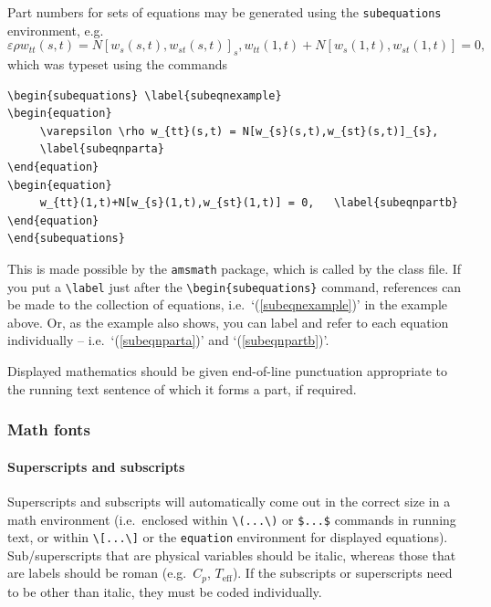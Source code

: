 \documentclass[]{interact}
\theoremstyle{plain}%
\theoremstyle{definition}
\theoremstyle{remark}
\begin{document}
Part numbers for sets of equations may be generated using the \texttt{subequations} environment, e.g.
\begin{subequations} \label{subeqnexample}
\begin{equation}
     \varepsilon \rho w_{tt}(s,t) = N[w_{s}(s,t),w_{st}(s,t)]_{s},
     \label{subeqnparta}
\end{equation}
\begin{equation}
     w_{tt}(1,t)+N[w_{s}(1,t),w_{st}(1,t)] = 0,
     \label{subeqnpartb}
\end{equation}
\end{subequations}
which was typeset using the commands
\begin{verbatim}
\begin{subequations} \label{subeqnexample}
\begin{equation}
     \varepsilon \rho w_{tt}(s,t) = N[w_{s}(s,t),w_{st}(s,t)]_{s},
     \label{subeqnparta}
\end{equation}
\begin{equation}
     w_{tt}(1,t)+N[w_{s}(1,t),w_{st}(1,t)] = 0,   \label{subeqnpartb}
\end{equation}
\end{subequations}
\end{verbatim}
This is made possible by the \texttt{amsmath} package, which is called by the class file. If you put a \verb"\label" just after the \verb"\begin{subequations}" command, references can be made to the collection of equations, i.e.\ `(\ref{subeqnexample})' in the example above. Or, as the example also shows, you can label and refer to each equation individually -- i.e.\ `(\ref{subeqnparta})' and `(\ref{subeqnpartb})'.

Displayed mathematics should be given end-of-line punctuation appropriate to the running text sentence of which it forms a part, if required.

\subsubsection{Math fonts}

\paragraph{Superscripts and subscripts}
Superscripts and subscripts will automatically come out in the correct size in a math environment (i.e.\ enclosed within \verb"\(...\)" or \verb"$...$" commands in running text, or within \verb"\[...\]" or the \texttt{equation} environment for displayed equations). Sub/superscripts that are physical variables should be italic, whereas those that are labels should be roman (e.g.\ $C_p$, $T_\mathrm{eff}$). If the subscripts or superscripts need to be other than italic, they must be coded individually.
\end{document}
